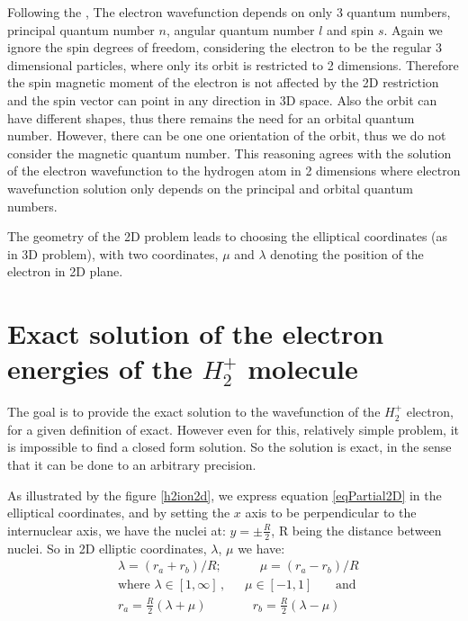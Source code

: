 Following the \cite{2DHAtom}, The electron wavefunction depends on only 3 quantum numbers, principal quantum number $ n $, angular quantum number $ l $ and spin $ s $. Again we ignore the spin degrees of freedom, considering the electron to be the regular 3 dimensional particles, where only its orbit is restricted to 2 dimensions.  Therefore the spin magnetic moment of the electron is not affected by the 2D restriction and the spin vector can point in any direction in 3D space. Also the orbit can have different shapes, thus there remains the need for an orbital quantum number. However, there can be one one orientation of the orbit, thus we do not consider the magnetic quantum number. This reasoning agrees with the solution of the electron wavefunction to the hydrogen atom in 2 dimensions \cite{H2atom} where electron wavefunction solution only depends on the principal and orbital quantum numbers.

The geometry of the 2D problem leads to choosing the elliptical coordinates (as in 3D problem), with two coordinates, $ \mu $ and $ \lambda $ denoting the position of the electron in 2D plane. \cite{Arfken}

\section{Exact solution of the electron energies of the \texorpdfstring{$ H_2^+ $}{$H_2^+$} molecule}

The goal is to provide the exact solution to the wavefunction of the $ H_2^{+} $ electron, for a given definition of exact. However even for this, relatively simple problem, it is impossible to find a closed form solution. So the solution is exact, in the sense that it can be done to an arbitrary precision.

As illustrated by the figure  \ref{h2ion2d}, we express equation \eqref{eqPartial2D} in the elliptical coordinates, and by setting the $ x $ axis to be perpendicular to the internuclear axis, we have the nuclei at: $ y = \pm \frac{R}{2}  $, R being the distance between nuclei. So in  2D elliptic coordinates, $ \lambda $, $ \mu $ we have:
\begin{equation}\label{variables1}
\begin{split}
& \lambda = \left(r_a + r_b\right)/R;\,\,\,\,\,\,\,\,\,\,\,\,\,\,\,\,\,\,\mu =  \left(r_a - r_b\right)/R  \\[1em]
& \text{where } \lambda \in \left[1,\infty\right]\,,\,\,\,\,\,\,\,\,\,\mu \in \left[ -1, 1 \right]\,\,\,\,\,\,\,\,\,\text{ and } \\[.8em] 
& r_a = \frac{R}{2}\left(\lambda + \mu \right)\,\,\,\,\,\,\,\,\,\,\,\,\,\,\,\,\,\,\,\,\,\, r_b = \frac{R}{2}\left(\lambda - \mu \right)
\end{split}
\end{equation}
\newpage

